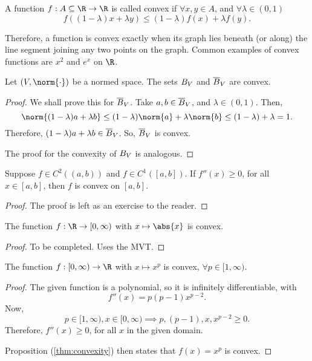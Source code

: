 \begin{ndfn}
  A function $f : A \subseteq \R \to \R$ is called convex if $\forall x,y \in A$, and $\forall \lambda \in (0,1)$
  \begin{equation*}
    f\left((1-\lambda) x + \lambda y\right) \leq (1-\lambda) f(x) + \lambda f(y).
  \end{equation*}
\end{ndfn}
Therefore, a function is convex exactly when its graph lies beneath (or along) the line segment joining any two points on the graph. Common examples of convex functions are $x^2$ and $e^x$ on $\R$.

\begin{nprop}
  Let $(V, \norm{\cdot})$ be a normed space. The sets $B_{V}$ and $\overline{B}_{V}$ are convex.
\end{nprop}
\begin{proof}
  We shall prove this for $\overline{B}_{V}$. Take $a, b \in \overline{B}_{V}$, and $\lambda \in (0,1)$. Then,
  \begin{equation*}
    \norm{(1-\lambda) a + \lambda b}
    \leq (1-\lambda) \norm{a} + \lambda \norm{b}
    \leq (1-\lambda) + \lambda
     = 1.
  \end{equation*}
  Therefore, $(1-\lambda) a + \lambda b \in \overline{B}_{V}$. So, $\overline{B}_{V}$ is convex.

  The proof for the convexity of $B_{V}$ is analogous.
\end{proof}

\begin{nprop}
\label{thm:convexity}
  Suppose $f \in C^2 ((a,b))$ and $f \in C^1 ([a,b])$. If $f''(x) \geq 0$, for all $x \in [a,b]$, then $f$ is convex on $[a,b]$.
\end{nprop}
\begin{proof}
  The proof is left as an exercise to the reader.
\end{proof}

\begin{nlemma}
  The function $f : \R \to [0,\infty)$ with $x \mapsto \abs{x}$ is convex.
\end{nlemma}
\begin{proof}
  To be completed. Uses the MVT.
\end{proof}

\begin{nlemma}
  The function $f : [0,\infty) \to \R$ with $x \mapsto x^p$ is convex, $\forall p \in [1,\infty)$.
\end{nlemma}
\begin{proof}
  The given function is a polynomial, so it is infinitely differentiable, with
  \begin{equation*}
    f''(x) = p(p-1)x^{p-2}.
  \end{equation*}
  Now,
  \begin{equation*}
    p \in [1,\infty), x \in [0,\infty) \implies p, (p-1), x, x^{p-2} \geq 0.
  \end{equation*}
  Therefore, $f''(x) \geq 0$, for all $x$ in the given domain.

  Proposition (\ref{thm:convexity}) then states that $f(x) = x^p$ is convex.
\end{proof}

